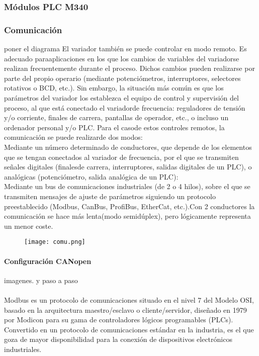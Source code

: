 
\subsubsection{Módulos PLC M340}



\subsubsection{Comunicación}
poner el diagrama
%
El   variador   también   se   puede   controlar   en   modo   remoto.   Es   adecuado   paraaplicaciones en   los   que   los   cambios   de   variables   del   variadorse   realizan frecuentemente  durante  el proceso.  Dichos  cambios  pueden  realizarse  por  parte  del propio  operario  (mediante  potenciómetros,  interruptores,  selectores  rotativos  o  BCD, etc.).  Sin  embargo,  la  situación  más  común  es  que  los  parámetros  del  variador  los establezca  el  equipo  de  control  y  supervisión  del  proceso,  al  que  está  conectado  el variadorde  frecuencia: reguladores  de  tensión  y/o  corriente,  finales  de  carrera, pantallas de operador, etc., o incluso un ordenador personal y/o PLC. Para  el  casode  estos  controles  remotos,  la  comunicación  se  puede  realizarde  dos modos:\\Mediante un  número  determinado  de  conductores,  que  depende  de  los elementos que se tengan conectados al variador de frecuencia, por el que se transmiten señales digitales (finalesde carrera, interruptores, salidas digitales de un PLC), o analógicas (potenciómetro, salida analógica de un PLC):\\Mediante un bus de comunicaciones industriales (de 2 o 4 hilos), sobre el que se transmiten   mensajes   de   ajuste   de   parámetros   siguiendo   un   protocolo preestablecido (Modbus, CanBus, ProfiBus, EtherCat, etc.).Con 2  conductores la  comunicación  se  hace  más  lenta(modo  semidúplex),  pero  lógicamente representa un menor coste.
	
	\begin{figure}[htb]
		\centering
		\texttt{[image: comu.png]}
	\end{figure}	
	

	\paragraph{Configuración CANopen}
	imagenes. y paso a paso\\
	\\
	Modbus es un protocolo de comunicaciones situado en el nivel 7 del Modelo OSI, basado en la arquitectura maestro/esclavo o cliente/servidor, diseñado en 1979 por Modicon para su gama de controladores lógicos programables (PLCs). Convertido en un protocolo de comunicaciones estándar en la industria, es el que goza de mayor disponibilidad para la conexión de dispositivos electrónicos industriales.
